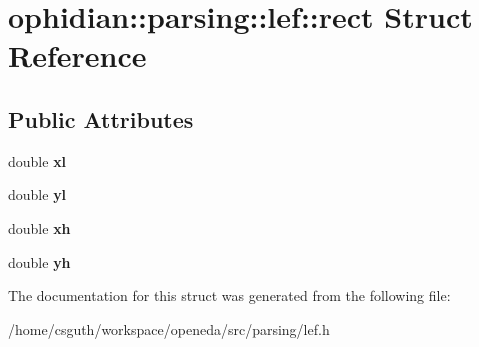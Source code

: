 \hypertarget{structophidian_1_1parsing_1_1lef_1_1rect}{\section{ophidian\-:\-:parsing\-:\-:lef\-:\-:rect Struct Reference}
\label{structophidian_1_1parsing_1_1lef_1_1rect}
}
\subsection*{Public Attributes}
\begin{DoxyCompactItemize}
\item 
\hypertarget{structophidian_1_1parsing_1_1lef_1_1rect_ab7d6ff78c6d734c324d8e53a3132a9f9}{double {\bfseries xl}}\label{structophidian_1_1parsing_1_1lef_1_1rect_ab7d6ff78c6d734c324d8e53a3132a9f9}

\item 
\hypertarget{structophidian_1_1parsing_1_1lef_1_1rect_a1113bc330addbec3312b31c7349d8d43}{double {\bfseries yl}}\label{structophidian_1_1parsing_1_1lef_1_1rect_a1113bc330addbec3312b31c7349d8d43}

\item 
\hypertarget{structophidian_1_1parsing_1_1lef_1_1rect_aaecd3e9710475f806b0c3229ae6a66f8}{double {\bfseries xh}}\label{structophidian_1_1parsing_1_1lef_1_1rect_aaecd3e9710475f806b0c3229ae6a66f8}

\item 
\hypertarget{structophidian_1_1parsing_1_1lef_1_1rect_a4fb8d685e40e36750d06a2b5f8ada211}{double {\bfseries yh}}\label{structophidian_1_1parsing_1_1lef_1_1rect_a4fb8d685e40e36750d06a2b5f8ada211}

\end{DoxyCompactItemize}


The documentation for this struct was generated from the following file\-:\begin{DoxyCompactItemize}
\item 
/home/csguth/workspace/openeda/src/parsing/lef.\-h\end{DoxyCompactItemize}
